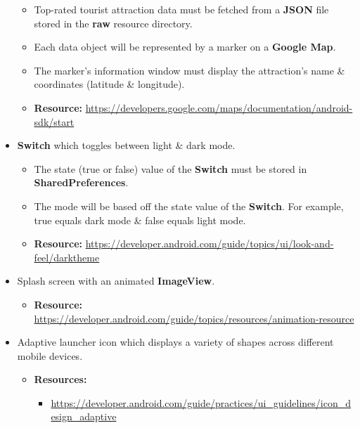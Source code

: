 \documentclass{article}
\begin{document}
\begin{itemize}
	      \begin{itemize}
		      \item Top-rated tourist attraction data must be fetched from a \textbf{JSON} file stored in the \textbf{raw} resource directory.
		      \item Each data object will be represented by a marker on a \textbf{Google Map}.
		      \item The marker's information window must display the attraction's name \& coordinates (latitude \& longitude).
		      \item \textbf{Resource:} \footnotesize\href{https://developers.google.com/maps/documentation/android-sdk/start}{https://developers.google.com/maps/documentation/android-sdk/start}
	      \end{itemize}
	\item \textbf{Switch} which toggles between light \& dark mode.
	      \begin{itemize}
		      \item The state (true or false) value of the \textbf{Switch} must be stored in \textbf{SharedPreferences}.
		      \item The mode will be based off the state value of the \textbf{Switch}. For example, true equals dark mode \& false equals light mode.
		      \item \textbf{Resource:} \footnotesize\href{https://developer.android.com/guide/topics/ui/look-and-feel/darktheme}{https://developer.android.com/guide/topics/ui/look-and-feel/darktheme}
	      \end{itemize}
	\item Splash screen with an animated \textbf{ImageView}.
	      \begin{itemize}
		      \item \textbf{Resource:} \footnotesize\href{https://developer.android.com/guide/topics/resources/animation-resource}{https://developer.android.com/guide/topics/resources/animation-resource}
	      \end{itemize}
	\item Adaptive launcher icon which displays a variety of shapes across different mobile devices.
	      \begin{itemize}
		      \item \textbf{Resources:}
		            \begin{itemize}
			            \item \footnotesize\href{https://developer.android.com/guide/practices/ui\_guidelines/icon\_design\_adaptive}{https://developer.android.com/guide/practices/ui\_guidelines/icon\_design\_adaptive}

\end{itemize}
\end{itemize}
\end{itemize}
\end{document}

